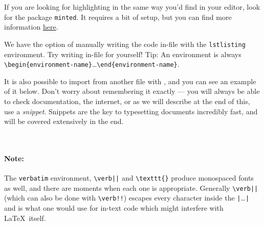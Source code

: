 If you are looking for highlighting in the same way you'd find in your editor, look for the package \texttt{minted}.
It requires a bit of setup, but you can find more information \href{http://tug.ctan.org/macros/latex/contrib/minted/minted.pdf}{here}.

We have the option of manually writing the code in-file with the \verb|lstlisting| environment.
Try writing in-file for yourself!
Tip: An environment is always \verb|\begin{environment-name}|\dots\verb|\end{environment-name}|.

It is also possible to import from another file with \verb||, and you can see an example of it below.
Don't worry about remembering it exactly --- you will always be able to check documentation, the internet, or as we will describe at the end of this, use a \emph{snippet}.
Snippets are the key to typesetting documents incredibly fast, and will be covered extensively in the end.
   
\begin{lstlisting}
    
\end{lstlisting}

\paragraph{Note:}
The \texttt{verbatim} environment, \verb!\verb||! and \verb|\texttt{}| produce monospaced fonts as well, and there are moments when each one is appropriate.
Generally \verb!\verb||! (which can also be done with \verb|\verb!!|) escapes every character inside the \verb!|!\dots\verb!|! and is what one would use for in-text code which might interfere with \LaTeX\ itself.